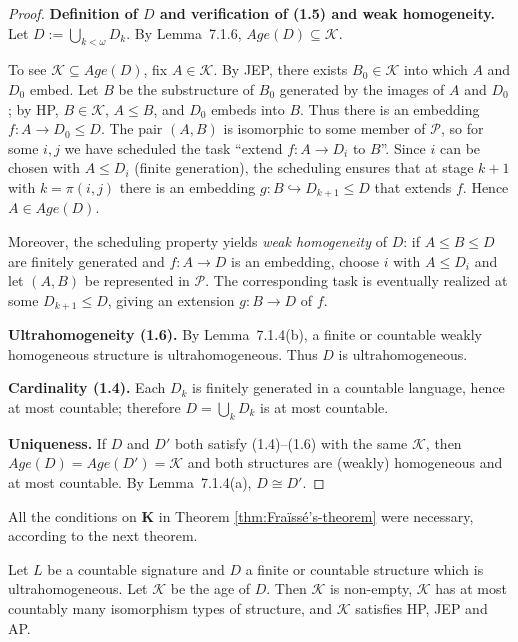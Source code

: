 \begin{mynote}
\begin{proof}
        \smallskip
        \textbf{Definition of $D$ and verification of (1.5) and weak homogeneity.}
        Let $D:=\bigcup_{k<\omega}D_k$. By Lemma~7.1.6, $ Age(D)\subseteq\mathcal{K}$.

        To see $\mathcal{K}\subseteq Age(D)$, fix $A\in\mathcal{K}$. By JEP, there exists
        $B_0\in\mathcal{K}$ into which $A$ and $D_0$ embed. Let $B$ be the substructure of $B_0$
        generated by the images of $A$ and $D_0$; by HP, $B\in\mathcal{K}$, $A\le B$, and $D_0$ embeds into $B$.
        Thus there is an embedding $f:A\to D_0\le D$. The pair $(A,B)$ is isomorphic to some member of $\mathcal{P}$,
        so for some $i,j$ we have scheduled the task “extend $f:A\to D_i$ to $B$”. Since $i$ can be chosen with
        $A\le D_i$ (finite generation), the scheduling ensures that at stage $k+1$ with $k=\pi(i,j)$ there is
        an embedding $g:B\hookrightarrow D_{k+1}\le D$ that extends $f$. Hence $A\in Age(D)$.

        Moreover, the scheduling property yields \emph{weak homogeneity} of $D$:
        if $A\le B\le D$ are finitely generated and $f:A\to D$ is an embedding, choose $i$ with $A\le D_i$ and
        let $(A,B)$ be represented in $\mathcal{P}$. The corresponding task is eventually realized at some
        $D_{k+1}\le D$, giving an extension $g:B\to D$ of $f$.

        \smallskip
        \textbf{Ultrahomogeneity (1.6).}
        By Lemma~7.1.4(b), a finite or countable weakly homogeneous structure is ultrahomogeneous.
        Thus $D$ is ultrahomogeneous.

        \smallskip
        \textbf{Cardinality (1.4).}
        Each $D_k$ is finitely generated in a countable language, hence at most countable; therefore
        $D=\bigcup_k D_k$ is at most countable.

        \smallskip
        \textbf{Uniqueness.}
        If $D$ and $D'$ both satisfy (1.4)–(1.6) with the same $\mathcal{K}$, then
        $ Age(D)= Age(D')=\mathcal{K}$ and both structures are (weakly) homogeneous and at most countable.
        By Lemma~7.1.4(a), $D\cong D'$.
    \end{proof}

\end{mynote}



All the conditions on \(\mathbf{K}\) in Theorem \ref{thm:Fraïssé’s-theorem} were necessary, according to the next theorem.


\begin{theorem}
    Let \(L\) be a countable signature and \(D\) a finite or countable structure which is ultrahomogeneous. Let \(\mathcal{K}\) be the age of \(D\). Then \(\mathcal{K}\) is non-empty, \(\mathcal{K}\) has at most countably many isomorphism types of structure, and \(\mathcal{K}\) satisfies HP, JEP and AP.
\end{theorem}

